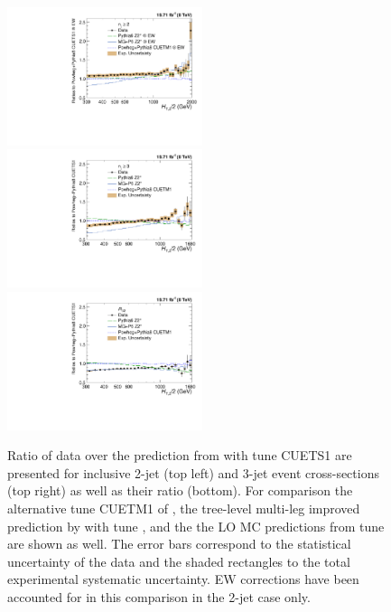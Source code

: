 \begin{figure}[!h]
 \begin{center}
 \hspace*{-5mm}\includegraphics[width=0.51\textwidth]{Plots_HT_2_150/Comparison_data_MC_samples_2_Pow_EW.pdf}%
 ~~\includegraphics[width=0.51\textwidth]{Plots_HT_2_150/Comparison_data_MC_samples_3_Pow.pdf}\\
 \includegraphics[width=0.51\textwidth]{Plots_HT_2_150/Comparison_data_MC_samples_ratio_32_Pow.pdf}\\
 \caption[]{Ratio of data over the prediction from \POWHEGn \plusn \PYTHIAE with tune CUETS1 are presented for inclusive 2-jet (top left) and 3-jet event cross-sections (top right) as well as their ratio \ratio (bottom). For comparison the alternative tune CUETM1 of \POWHEGn \plusn \PYTHIAE, the tree-level multi-leg improved prediction by \MadGraphFn \plusn \PYTHIAS with tune \Ztwostar, and the the LO MC predictions from \PYTHIAS tune \Ztwostar are shown as well. The error bars correspond to the statistical uncertainty of the data and the shaded rectangles to the total experimental systematic uncertainty. EW corrections have been accounted for in this comparison in the 2-jet case only.}
 \label{fig:data_MC}
 \end{center}
\end{figure}


